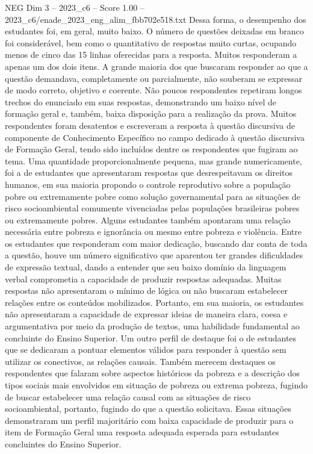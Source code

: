 \begin{textsample}{NEG Dim 3 – 2023\_c6 – Score 1.00 – 2023\_c6/enade\_2023\_eng\_alim\_fbb702e518.txt}
Dessa forma, o desempenho dos estudantes foi, em geral, muito baixo.
O número de questões deixadas em branco foi considerável, bem como o quantitativo de respostas muito curtas, ocupando menos de cinco das 15 linhas oferecidas para a resposta.
Muitos responderam a apenas um dos dois itens.
A grande maioria dos que buscaram responder ao que a questão demandava, completamente ou parcialmente, não souberam se expressar de modo correto, objetivo e coerente.
Não poucos respondentes repetiram longos trechos do enunciado em suas respostas, demonstrando um baixo nível de formação geral e, também, baixa disposição para a realização da prova.
Muitos respondentes foram desatentos e escreveram a resposta à questão discursiva de componente de Conhecimento Específico no campo dedicado à questão discursiva de Formação Geral, tendo sido incluídos dentre os respondentes que fugiram ao tema.
Uma quantidade proporcionalmente pequena, mas grande numericamente, foi a de estudantes que apresentaram respostas que desrespeitavam os direitos humanos, em sua maioria propondo o controle reprodutivo sobre a população pobre ou extremamente pobre como solução governamental para as situações de risco socioambiental comumente vivenciadas pelas populações brasileiras pobres ou extremamente pobres.
Alguns estudantes também apontaram uma relação necessária entre pobreza e ignorância ou mesmo entre pobreza e violência.
Entre os estudantes que responderam com maior dedicação, buscando dar conta de toda a questão, houve um número significativo que aparentou ter grandes dificuldades de expressão textual, dando a entender que seu baixo domínio da linguagem verbal comprometia a capacidade de produzir respostas adequadas.
Muitas respostas não apresentaram o mínimo de lógica ou não buscaram estabelecer relações entre os conteúdos mobilizados.
Portanto, em sua maioria, os estudantes não apresentaram a capacidade de expressar ideias de maneira clara, coesa e argumentativa por meio da produção de textos, uma habilidade fundamental ao concluinte do Ensino Superior.
Um outro perfil de destaque foi o de estudantes que se dedicaram a pontuar elementos válidos para responder à questão sem utilizar os conectivos, as relações causais.
Também merecem destaques os respondentes que falaram sobre aspectos históricos da pobreza e a descrição dos tipos sociais mais envolvidos em situação de pobreza ou extrema pobreza, fugindo de buscar estabelecer uma relação causal com as situações de risco socioambiental, portanto, fugindo do que a questão solicitava.
Essas situações demonstraram um perfil majoritário com baixa capacidade de produzir para o item de Formação Geral uma resposta adequada esperada para estudantes concluintes do Ensino Superior.

\end{textsample}
